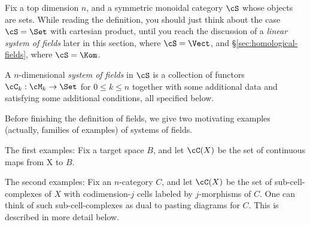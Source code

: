 \documentclass[11pt,leqno]{amsart}
\begin{document}
Fix a top dimension $n$, and a symmetric monoidal category $\cS$ whose objects are sets. While reading the definition, you should just think about the case $\cS = \Set$ with cartesian product, until you reach the discussion of a \emph{linear system of fields} later in this section, where $\cS = \Vect$, and \S \ref{sec:homological-fields}, where $\cS = \Kom$.

A $n$-dimensional {\it system of fields} in $\cS$
is a collection of functors $\cC_k : \cM_k \to \Set$ for $0 \leq k \leq n$
together with some additional data and satisfying some additional conditions, all specified below.


Before finishing the definition of fields, we give two motivating examples
(actually, families of examples) of systems of fields.

The first examples: Fix a target space $B$, and let $\cC(X)$ be the set of continuous maps
from X to $B$.

The second examples: Fix an $n$-category $C$, and let $\cC(X)$ be 
the set of sub-cell-complexes of $X$ with codimension-$j$ cells labeled by
$j$-morphisms of $C$.
One can think of such sub-cell-complexes as dual to pasting diagrams for $C$.
This is described in more detail below.
\end{document}
